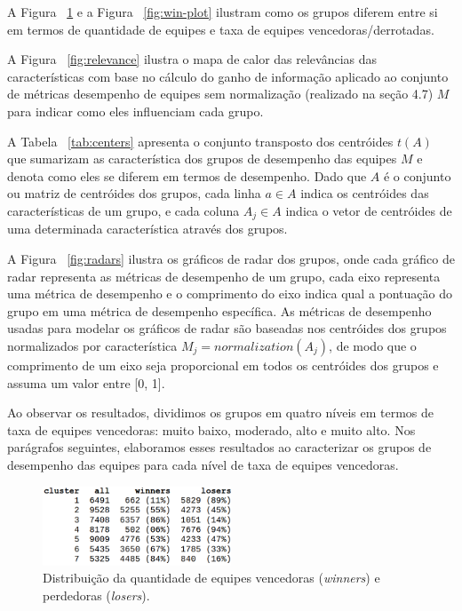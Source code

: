 A Figura ~\ref{fig:win-table} e a Figura ~\ref{fig:win-plot} ilustram como os grupos diferem entre si em termos de quantidade de equipes e taxa de equipes vencedoras/derrotadas.

A Figura ~\ref{fig:relevance} ilustra o mapa de calor das relevâncias das características com base no cálculo do ganho de informação aplicado ao conjunto de métricas desempenho de equipes sem normalização (realizado na seção 4.7) $M$ para indicar como eles influenciam cada grupo.

A Tabela ~\ref{tab:centers} apresenta o conjunto transposto dos centróides $t(A)$ que sumarizam as característica dos grupos de desempenho das equipes $M$ e denota como eles se diferem em termos de desempenho. Dado que $A$ é o conjunto ou matriz de centróides dos grupos, cada linha $a \in A$ indica os centróides das características de um grupo, e cada coluna $A_j \in A$ indica o vetor de centróides de uma determinada característica através dos grupos.

A Figura ~\ref{fig:radars} ilustra os gráficos de radar dos grupos, onde cada gráfico de radar representa as métricas de desempenho de um grupo, cada eixo representa uma métrica de desempenho e o comprimento do eixo indica qual a pontuação do grupo em uma métrica de desempenho específica. As métricas de desempenho usadas para modelar os gráficos de radar são baseadas nos centróides dos grupos normalizados por característica $M_j = normalization(A_j)$, de modo que o comprimento de um eixo seja proporcional em todos os centróides dos grupos e assuma um valor entre [0, 1].

Ao observar os resultados, dividimos os grupos em quatro níveis em termos de taxa de equipes vencedoras: muito baixo, moderado, alto e muito alto. Nos parágrafos seguintes, elaboramos esses resultados ao caracterizar os grupos de desempenho das equipes para cada nível de taxa de equipes vencedoras.

\begin{figure}
  \centering
  \includegraphics[width=0.5\textwidth]{win-rate-table}%
  \caption{Distribuição da quantidade de equipes vencedoras (\textit{winners}) e perdedoras (\textit{losers}).}
  \label{fig:win-table}
\end{figure}

